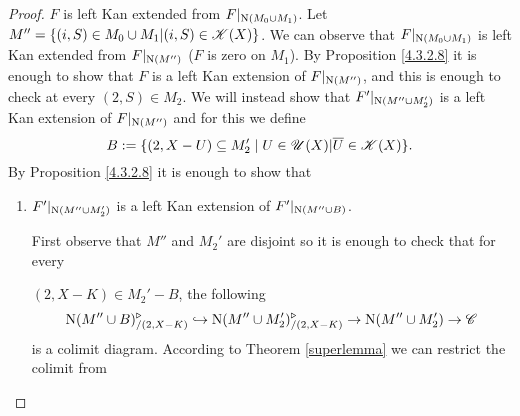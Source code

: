 \documentclass[../../thesis.tex]{subfiles}
\begin{document}
\begin{proof}
    $F$ is left Kan extended from $F|_{\mathrm{N}(M_0\cup M_1)}$.
    Let $M''=\{(i,S) \in M_0 \cup M_1 | (i,S)\in \mathscr{K}(X)\}$.
    We can observe that $F|_{\mathrm{N}(M_0 \cup M_1)}$ is left Kan extended from $F|_{\mathrm{N}(M'')}$ ($F$ is zero on $M_1$).
    By Proposition \ref{4.3.2.8} it is enough to show that $F$ is a left Kan extension of $F|_{\mathrm{N}(M'')}$, and this is enough to check at every $(2,S) \in M_2$.
    We will instead show that $F'|_{\mathrm{N}(M'' \cup M_2')}$ is a left Kan extension of $F|_{\mathrm{N}(M'')}$ and for this we define
    \[B:=\{(2, X- U) \subseteq M_2' \mid U \in \mathscr{U}(X) | \overline{U} \in \mathscr{K}(X)\} .\]
    By Proposition \ref{4.3.2.8} it is enough to show that
    \begin{enumerate}[label=(\alph*)]
        \item $F'|_{\mathrm{N}(M'' \cup M_2')}$ is a left Kan extension of $F'|_{\mathrm{N}(M'' \cup B)}$.


              First observe that $M''$ and $M_2'$ are disjoint so it is enough to check that for every

              $(2,X-K)\in M_2' - B$, the following
              \[
                  \mathrm{N}(M'' \cup B)^{\triangleright}_{/(2,X-K)} \hookrightarrow  \mathrm{N}(M'' \cup M_2')^{\triangleright}_{/(2,X-K)} \to \mathrm{N}(M''\cup M_2') \to \mathscr{C}
              \]
              is a colimit diagram.
              According to Theorem \ref{superlemma} we can restrict the colimit from


\end{enumerate}
\end{proof}
\end{document}
